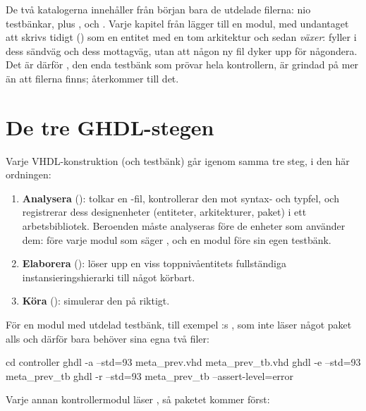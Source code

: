 De två katalogerna innehåller från början bara de utdelade filerna: nio testbänkar, plus
,  och . Varje kapitel från 
lägger till en modul, med undantaget att  skrivs tidigt () som en entitet
med en tom arkitektur och sedan \emph{växer}:  fyller i dess sändväg och
 dess mottagväg, utan att någon ny fil dyker upp för någondera. Det är därför
, den enda testbänk som prövar hela kontrollern, är grindad på mer än att
filerna finns;  återkommer till det.

\section{De tre GHDL-stegen}
\label{app:sim:steps}

Varje VHDL-konstruktion (och testbänk) går igenom samma tre steg, i den här ordningen:

\begin{enumerate}
  \item \textbf{Analysera} (): tolkar en -fil, kontrollerar den mot
    syntax- och typfel, och registrerar dess designenheter (entiteter, arkitekturer, paket) i ett
    arbetsbibliotek. Beroenden måste analyseras före de enheter som använder dem:
     före varje modul som säger , och en modul före
    sin egen testbänk.
  \item \textbf{Elaborera} (): löser upp en viss toppnivåentitets fullständiga
    instansieringshierarki till något körbart.
  \item \textbf{Köra} (): simulerar den på riktigt.
\end{enumerate}

För en modul med utdelad testbänk, till exempel :s , som inte läser
något paket alls och därför bara behöver sina egna två filer:

\begin{shell}
cd controller
ghdl -a --std=93 meta_prev.vhd meta_prev_tb.vhd
ghdl -e --std=93 meta_prev_tb
ghdl -r --std=93 meta_prev_tb --assert-level=error
\end{shell}

Varje annan kontrollermodul läser , så paketet kommer först:

